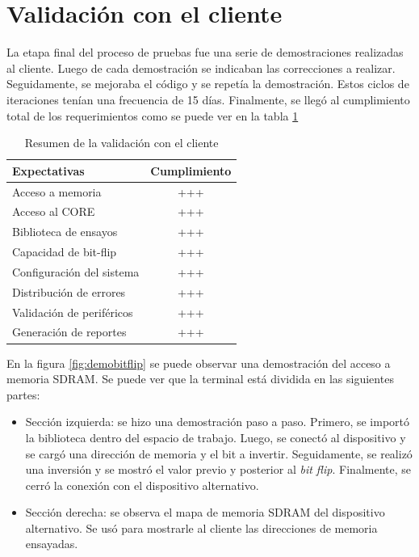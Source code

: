 \section{Validación con el cliente}
\label{sec:validacion}

La etapa final del proceso de pruebas fue una serie de demostraciones realizadas al cliente.
Luego de cada demostración se indicaban las correcciones a realizar.
Seguidamente, se mejoraba el código y se repetía la demostración.
Estos ciclos de iteraciones tenían una frecuencia de 15 días.
Finalmente, se llegó al cumplimiento total de los requerimientos como se puede ver en la tabla \ref{tab:validacion}

\begin{table}[h]
	\centering
	\caption[Resumen de la validación con el cliente]{Resumen de la validación con el cliente}

	\begin{tabular}{l c}    
		\toprule
        \textbf{Expectativas}     & \textbf{Cumplimiento} \\
		\midrule
		Acceso a memoria          & +++                   \\
		Acceso al CORE            & +++                   \\
		Biblioteca de ensayos     & +++                   \\		
		Capacidad de bit-flip     & +++                   \\
		Configuración del sistema & +++                   \\
		Distribución de errores   & +++                   \\
		Validación de periféricos & +++                   \\
        Generación de reportes    & +++                   \\
		\bottomrule
		\hline
	\end{tabular}
	\label{tab:validacion}
\end{table}

En la figura \ref{fig:demobitflip} se puede observar una demostración del acceso a memoria SDRAM.
Se puede ver que la terminal está dividida en las siguientes partes:

\begin{itemize}
    \item Sección izquierda: se hizo una demostración paso a paso.
        Primero, se importó la biblioteca dentro del espacio de trabajo.
        Luego, se conectó al dispositivo y se cargó una dirección de memoria y el bit a invertir.
        Seguidamente, se realizó una inversión y se mostró el valor previo y posterior al \emph{bit flip}.
        Finalmente, se cerró la conexión con el dispositivo alternativo.
    \item Sección derecha: se observa el mapa de memoria SDRAM del dispositivo alternativo.
        Se usó para mostrarle al cliente las direcciones de memoria ensayadas.
\end{itemize}

